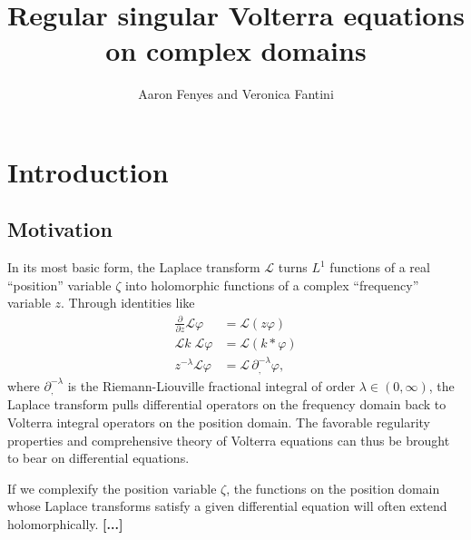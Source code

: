 \documentclass{article}
\title{Regular singular Volterra equations on complex domains}
\author{Aaron Fenyes and Veronica Fantini}
\date{}
\theoremstyle{plain}
\newcommand{\laplace}{\mathcal{L}}
\newcommand{\fracderiv}[3]{\partial^{#1}_{#2, #3}}
\begin{document}
\maketitle
\section{Introduction}
\subsection{Motivation}\label{motivation}
In its most basic form, the Laplace transform $\laplace$ turns $L^1$ functions of a real ``position'' variable $\zeta$ into holomorphic functions of a complex ``frequency'' variable $z$. Through identities like
\begin{align*}
\frac{\partial}{\partial z} \laplace \varphi & = \laplace(z\varphi) \\
\laplace k\;\laplace \varphi & = \laplace(k * \varphi) \\
z^{-\lambda} \laplace \varphi & = \laplace\,\fracderiv{-\lambda}{}{} \varphi,
\end{align*}
where $\fracderiv{-\lambda}{}{}$ is the Riemann-Liouville fractional integral of order $\lambda \in (0, \infty)$, the Laplace transform pulls differential operators on the frequency domain back to Volterra integral operators on the position domain. The favorable regularity properties and comprehensive theory of Volterra equations can thus be brought to bear on differential equations.

If we complexify the position variable $\zeta$, the functions on the position domain whose Laplace transforms satisfy a given differential equation will often extend holomorphically. \textbf{[...]}
\end{document}
